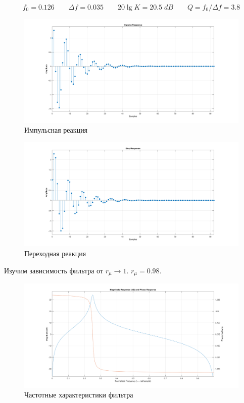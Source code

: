 \documentclass[12pt,a4paper]{article}
\begin{document}
	$$ f_0 = 0.126 \qquad \Delta f = 0.035 \qquad 20 \lg K = 20.5 \;dB \qquad Q = f_0 / \Delta f = 3.8$$
	
	\begin{figure}[H]
		\centering
		\includegraphics[width=1.0\linewidth]{res/3_1_impulse.png}
		\caption{Импульсная реакция}
	\end{figure}

	\begin{figure}[H]
		\centering
		\includegraphics[width=1.0\linewidth]{res/3_1_step.png}
		\caption{Переходная реакция}
	\end{figure}

	Изучим зависимость фильтра от $r_\mu \rightarrow 1$. $r_\mu = 0.98$.
	
	\begin{figure}[H]
		\centering
		\includegraphics[width=1.0\linewidth]{res/3_2_bandpass_098.png}
		\caption{Частотные характеристики фильтра}
	\end{figure}
	
\end{document}
